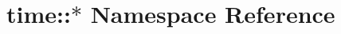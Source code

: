 \hypertarget{namespacetime_1_1_5}{
\section{time::$\ast$ Namespace Reference}
\label{namespacetime_1_1_5}
}


